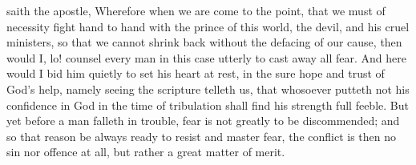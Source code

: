 \documentclass[a5paper]{scrbook}
\begin{document}
	 saith the apostle,  Wherefore when we are come to the point, that we must of necessity fight hand to hand with the prince of this world, the devil, and his cruel ministers, so that we cannot shrink back without the defacing of our cause, then would I, lo! counsel every man in this case utterly to cast away all fear. And here would I bid him quietly to set his heart at rest, in the sure hope and trust of God's help, namely seeing the scripture telleth us, that whosoever putteth not his confidence in God in the time of tribulation shall find his strength full feeble. But yet before a man falleth in trouble, fear is not greatly to be discommended; and so that reason be always ready to resist and master fear, the conflict is then no sin nor offence at all, but rather a great matter of merit.
	
\end{document}
